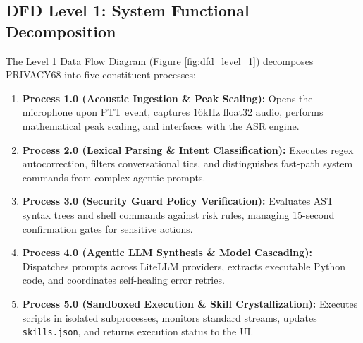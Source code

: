 \subsection{DFD Level 1: System Functional Decomposition}
The Level 1 Data Flow Diagram (Figure \ref{fig:dfd_level_1}) decomposes PRIVACY68 into five constituent processes:
\begin{enumerate}
    \item \textbf{Process 1.0 (Acoustic Ingestion \& Peak Scaling):} Opens the microphone upon PTT event, captures 16kHz float32 audio, performs mathematical peak scaling, and interfaces with the ASR engine.
    \item \textbf{Process 2.0 (Lexical Parsing \& Intent Classification):} Executes regex autocorrection, filters conversational tics, and distinguishes fast-path system commands from complex agentic prompts.
    \item \textbf{Process 3.0 (Security Guard Policy Verification):} Evaluates AST syntax trees and shell commands against risk rules, managing 15-second confirmation gates for sensitive actions.
    \item \textbf{Process 4.0 (Agentic LLM Synthesis \& Model Cascading):} Dispatches prompts across LiteLLM providers, extracts executable Python code, and coordinates self-healing error retries.
    \item \textbf{Process 5.0 (Sandboxed Execution \& Skill Crystallization):} Executes scripts in isolated subprocesses, monitors standard streams, updates \texttt{skills.json}, and returns execution status to the UI.
\end{enumerate}

